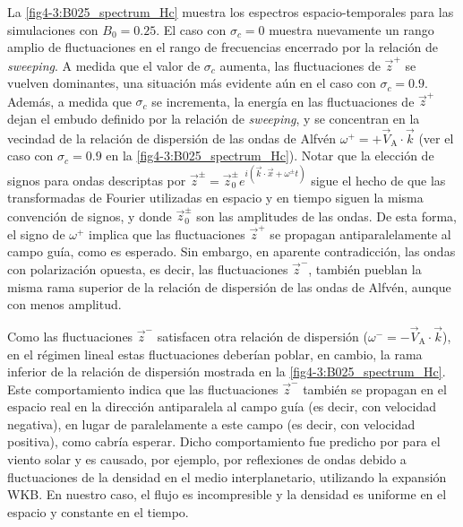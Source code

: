 La \cref{fig4-3:B025_spectrum_Hc} muestra los espectros
espacio-temporales para las simulaciones con $B_0=0.25$. El caso con
$\sigma_c=0$ muestra nuevamente un rango amplio de fluctuaciones en el
rango de frecuencias encerrado por la relación de \textit{sweeping}. A medida
que el valor de $\sigma_c$ aumenta, las fluctuaciones de $\vec{z}^+$
se vuelven dominantes, una situación más evidente aún en el caso con
$\sigma_c=0.9$. Además, a medida que $\sigma_c$ se incrementa, la
energía en las fluctuaciones de $\vec{z}^+$ dejan el embudo definido
por la relación de \textit{sweeping}, y se concentran en la vecindad de la
relación de dispersión de las ondas de Alfvén $\omega^+ =
+\vec{V}_\textrm{A} \cdot \vec{k}$ (ver el caso con $\sigma_c=0.9$ en
la \cref{fig4-3:B025_spectrum_Hc}). Notar que la elección de signos para
ondas descriptas por $\vec{z}^\pm={\vec z}_0^\pm e^{i(\vec{k} \cdot
  \vec{x}+\omega^\pm t)}$ sigue el hecho de que las transformadas de
Fourier utilizadas en espacio y en tiempo siguen la misma convención
de signos, y donde ${\vec z}_0^\pm$ son las amplitudes de las ondas.
De esta forma, el signo de $\omega^+$ implica que las fluctuaciones
$\vec{z}^+$ se propagan antiparalelamente al campo guía, como es
esperado. Sin embargo, en aparente contradicción, las ondas con
polarización opuesta, es decir, las fluctuaciones $\vec{z}^-$, también
pueblan la misma rama superior de la relación de dispersión de las
ondas de Alfvén, aunque con menos amplitud.

Como las fluctuaciones $\vec{z}^-$ satisfacen otra relación de
dispersión ($\omega^- = -\vec{V}_\textrm{A} \cdot \vec{k}$), en el
régimen lineal estas fluctuaciones deberían poblar, en cambio, la rama
inferior de la relación de dispersión mostrada en la
\cref{fig4-3:B025_spectrum_Hc}. Este comportamiento indica que las
fluctuaciones $\vec{z}^-$ también se propagan en el espacio real en la
dirección antiparalela al campo guía (es decir, con velocidad
negativa), en lugar de paralelamente a este campo (es decir, con
velocidad positiva), como cabría esperar. Dicho comportamiento fue
predicho por \cite{hollweg_1990_wkb} para el viento solar y es
causado, por ejemplo, por reflexiones de ondas debido a fluctuaciones
de la densidad en el medio interplanetario, utilizando la expansión
WKB. En nuestro caso, el flujo es incompresible y la densidad es
uniforme en el espacio y constante en el tiempo.

